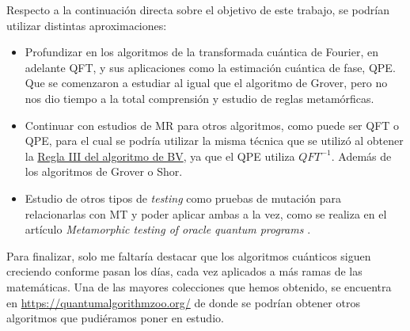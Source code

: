\newpage
Respecto a la continuación directa sobre el objetivo de este trabajo, se podrían utilizar distintas aproximaciones:

\begin{itemize}
    \item Profundizar en los algoritmos de la transformada cuántica de Fourier, en adelante QFT, y sus aplicaciones como la estimación cuántica de fase, QPE. Que se comenzaron a estudiar al igual que el algoritmo de Grover, pero no nos dio tiempo a la total comprensión y estudio de reglas metamórficas.

    \item Continuar con estudios de MR para otros algoritmos, como puede ser QFT o QPE, para el cual se podría utilizar la misma técnica que se utilizó al obtener la \hyperref[RIII:BV]{Regla III del algoritmo de BV}, ya que el QPE utiliza $QFT^{-1}$. Además de los algoritmos de Grover o Shor.

    \item Estudio de otros tipos de \textit{testing} como pruebas de mutación para relacionarlas con MT y poder aplicar ambas a la vez, como se realiza en el artículo \textit{Metamorphic testing of oracle quantum programs} \cite{metamorphicAdd:2022}.
\end{itemize}

Para finalizar, solo me faltaría destacar que los algoritmos cuánticos siguen creciendo conforme pasan los días, cada vez aplicados a más ramas de las matemáticas. Una de las mayores colecciones que hemos obtenido, se encuentra en \url{https://quantumalgorithmzoo.org/} de donde se podrían obtener otros algoritmos que pudiéramos poner en estudio.